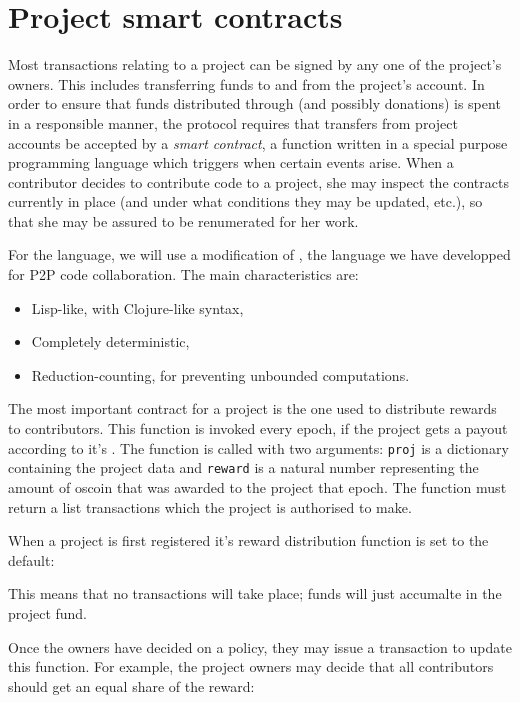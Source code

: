 \section{Project smart contracts}

Most transactions relating to a project can be signed by any one of the
project's owners. This includes transferring funds to and from the project's
account. In order to ensure that funds distributed through \osrank{} (and
possibly donations) is spent in a responsible manner, the protocol requires that
transfers from project accounts be accepted by a \emph{smart contract}, a
function written in a special purpose programming language which triggers when
certain events arise. When a contributor decides to contribute code to a
project, she may inspect the contracts currently in place (and under what
conditions they may be updated, etc.), so that she may be assured to be
renumerated for her work.
 
For the language, we will use a modification of \radicle{}, the language we have
developped for P2P code collaboration. The main characteristics are:
\begin{itemize}
\item Lisp-like, with Clojure-like syntax,
\item Completely deterministic,
\item Reduction-counting, for preventing unbounded computations.
\end{itemize}

The most important contract for a project is the one used to distribute rewards
to contributors. This function is invoked every epoch, if the project gets a
payout according to it's \osrank{}. The function is called with two arguments:
\texttt{proj} is a dictionary containing the project data and \texttt{reward} is
a natural number representing the amount of oscoin that was awarded to the
project that epoch. The function must return a list transactions which the
project is authorised to make.

When a project is first registered it's reward distribution function is set to
the default:

\begin{algorithmic}[1]
\EndProcedure
\end{algorithmic}

This means that no transactions will take place; funds will just accumalte in
the project fund.

Once the owners have decided on a policy, they may issue a transaction to update
this function. For example, the project owners may decide that all contributors
should get an equal share of the reward:

